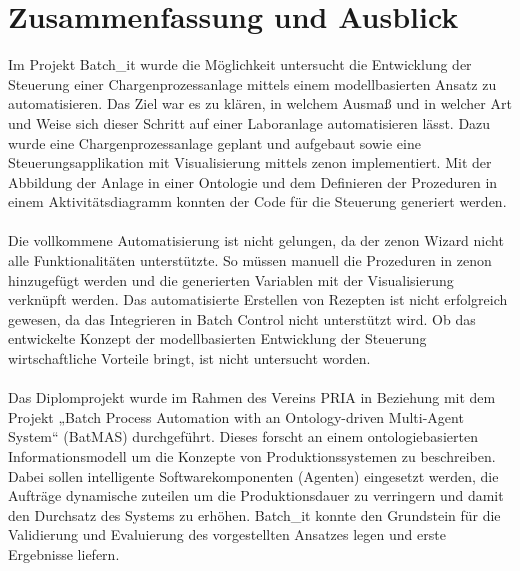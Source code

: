 

\chapter{Zusammenfassung und Ausblick} \label{chapter:conclusion}

Im Projekt Batch\_it wurde die Möglichkeit untersucht die Entwicklung der Steuerung einer Chargenprozessanlage mittels einem modellbasierten Ansatz zu automatisieren. Das Ziel war es zu klären, in welchem Ausmaß und in welcher Art und Weise sich dieser Schritt auf einer Laboranlage automatisieren lässt. Dazu wurde eine Chargenprozessanlage geplant und aufgebaut sowie eine Steuerungsapplikation mit Visualisierung mittels zenon implementiert. 
Mit der Abbildung der Anlage in einer Ontologie und dem Definieren der Prozeduren in einem Aktivitätsdiagramm konnten der Code für die Steuerung generiert werden. \\\\
Die vollkommene Automatisierung ist nicht gelungen, da der zenon Wizard nicht alle Funktionalitäten unterstützte. So müssen manuell die Prozeduren in zenon hinzugefügt werden und die generierten Variablen mit der Visualisierung verknüpft werden. Das automatisierte Erstellen von Rezepten ist nicht erfolgreich gewesen, da das Integrieren in Batch Control nicht unterstützt wird. Ob das entwickelte Konzept der modellbasierten Entwicklung der Steuerung wirtschaftliche Vorteile bringt, ist nicht untersucht worden. \\\\
Das Diplomprojekt wurde im Rahmen des Vereins PRIA in Beziehung mit dem Projekt „Batch Process Automation with an On\-to\-lo\-gy-driven Multi-Agent System“ (BatMAS) durchgeführt. Dieses forscht an einem ontologiebasierten Informationsmodell um die Konzepte von Produktionssystemen zu beschreiben. Dabei sollen intelligente Softwarekomponenten (Agenten) eingesetzt werden, die Aufträge dynamische zuteilen um die Produktionsdauer zu verringern und damit den Durchsatz des Systems zu erhöhen. Batch\_it konnte den Grundstein für die Validierung und Evaluierung des vorgestellten Ansatzes legen und erste Ergebnisse liefern.\\\\
